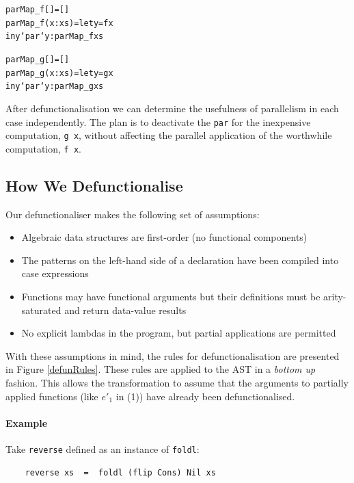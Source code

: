 \pagebreak

\begin{alltt}
    parMap_f []     = []
    parMap_f (x:xs) = let y = f x
                      in y `par` y : parMap_f xs

    parMap_g []     = []
    parMap_g (x:xs) = let y = g x
                      in y `par` y : parMap_g xs
\end{alltt}


After defunctionalisation we can determine the usefulness of parallelism
in each case independently. The plan is to deactivate the \verb-par- for the
inexpensive computation, \verb-g x-, without affecting the parallel application
of the worthwhile computation, \verb-f x-.

\subsection{How We Defunctionalise}

Our defunctionaliser makes the following set of assumptions:

\begin{itemize}
  \item Algebraic data structures are first-order (no functional components)
  \item The patterns on the left-hand side of a declaration have been compiled
        into case expressions
  \item Functions may have functional arguments but their definitions must be
        arity-saturated and return data-value results
  \item No explicit lambdas in the program, but partial applications are permitted
\end{itemize}

With these assumptions in mind, the rules for defunctionalisation are presented
in Figure \ref{defunRules}. These rules are applied to the AST in a
\emph{bottom up} fashion. This allows the transformation to assume that the
arguments to partially applied functions (like $e'_{1}$ in (1)) have already
been defunctionalised.

\paragraph{Example}

Take \verb-reverse- defined as an instance of \verb-foldl-:

\begin{verbatim}
    reverse xs  =  foldl (flip Cons) Nil xs
\end{verbatim}

